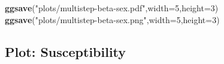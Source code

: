 \documentclass[
]{article}
\newenvironment{Shaded}{\begin{snugshade}}{\end{snugshade}}
\newcommand{\DataTypeTok}[1]{\textcolor[rgb]{0.13,0.29,0.53}{#1}}
\newcommand{\DecValTok}[1]{\textcolor[rgb]{0.00,0.00,0.81}{#1}}
\newcommand{\KeywordTok}[1]{\textcolor[rgb]{0.13,0.29,0.53}{\textbf{#1}}}
\newcommand{\NormalTok}[1]{#1}
\newcommand{\StringTok}[1]{\textcolor[rgb]{0.31,0.60,0.02}{#1}}
\begin{document}
\begin{Shaded}
\begin{Highlighting}[]
\KeywordTok{ggsave}\NormalTok{(}\StringTok{"plots/multistep-beta-sex.pdf"}\NormalTok{,}\DataTypeTok{width=}\DecValTok{5}\NormalTok{,}\DataTypeTok{height=}\DecValTok{3}\NormalTok{)}
\KeywordTok{ggsave}\NormalTok{(}\StringTok{"plots/multistep-beta-sex.png"}\NormalTok{,}\DataTypeTok{width=}\DecValTok{5}\NormalTok{,}\DataTypeTok{height=}\DecValTok{3}\NormalTok{)}
\end{Highlighting}
\end{Shaded}

\hypertarget{plot-susceptibility}{%
\subsection{Plot: Susceptibility}\label{plot-susceptibility}}
\end{document}
